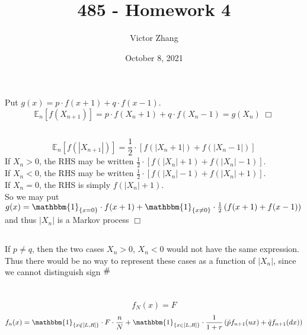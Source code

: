 \documentclass{article}
\title{485 - Homework 4}
\author{Victor Zhang}
\date{October 8, 2021}
\newcommand{\contra}{\raisebox{\depth}{\#}}
\begin{document}
\maketitle

\section{}
\subsection{}
Put $g(x) = p \cdot f(x + 1) + q \cdot f(x - 1)$.
$$\mathbb{E}_n[f(X_{n+1})] = p \cdot f(X_n + 1) + q \cdot f(X_n - 1) = g(X_n) \; \Box$$

\subsection{}
$$\mathbb{E}_n[f(|X_{n+1}|)] = \frac{1}{2} \cdot \left[ f(|X_n + 1|) + f(|X_n - 1|) \right]$$
If $X_n > 0$, the RHS may be written $\frac{1}{2} \cdot \left[ f(|X_n| + 1) + f(|X_n| - 1) \right]$.\\
If $X_n < 0$, the RHS may be written $\frac{1}{2} \cdot \left[ f(|X_n| - 1) + f(|X_n| + 1) \right]$.\\
If $X_n = 0$, the RHS is simply $f(|X_n| + 1)$.\\
So we may put $g(x) = \mathbbm{1}_{\{x = 0\}} \cdot f(x + 1) + \mathbbm{1}_{\{x \neq 0\}} \cdot \frac{1}{2} \left( f(x + 1) + f(x - 1) \right)$ and thus $|X_n|$ is a Markov process $\Box$

\subsection{}
If $p \neq q$, then the two cases $X_n > 0$, $X_n < 0$ would not have the same expression. Thus there would be no way to represent these cases as a function of $|X_n|$, since we cannot distinguish sign $\contra$

\section{}
\subsection{}
$$f_N(x) = F$$
$$f_n(x) = \mathbbm{1}_{\{x \notin [L,R]\}} \cdot F \cdot \frac{n}{N} + \mathbbm{1}_{\{x \in [L,R]\}} \cdot \frac{1}{1+r} \left( \tilde{p} f_{n+1}(ux) + \tilde{q} f_{n+1}(dx) \right)$$
\end{document}
